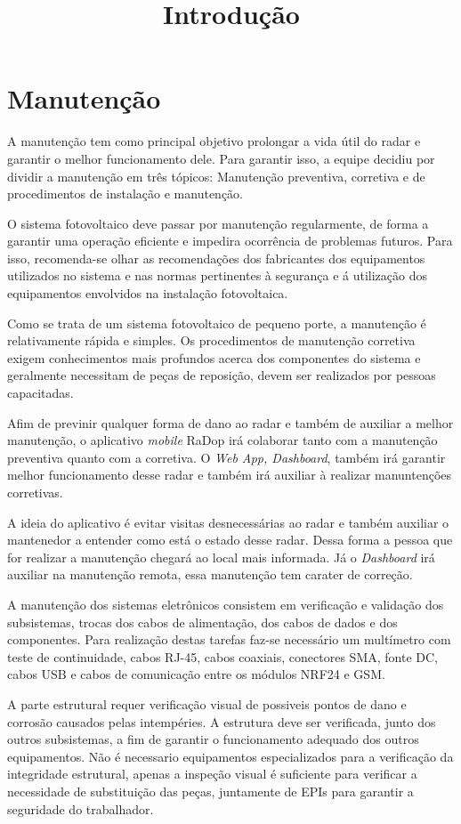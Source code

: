 
\chapter{Manutenção}

\title{Introdução}

A manutenção tem como principal objetivo prolongar a vida útil do radar e garantir o melhor funcionamento dele. Para garantir isso, a equipe decidiu por dividir a manutenção em três tópicos: Manutenção preventiva, corretiva e de procedimentos de instalação e manutenção.

O sistema fotovoltaico deve passar por manutenção regularmente, de forma a garantir uma operação eficiente e impedira ocorrência de problemas futuros. Para isso, recomenda-se olhar as recomendações dos fabricantes dos equipamentos utilizados no sistema e nas normas pertinentes à segurança e á utilização dos equipamentos envolvidos na instalação fotovoltaica.

Como se trata de um sistema fotovoltaico de pequeno porte, a manutenção é relativamente rápida e simples. Os procedimentos de manutenção corretiva exigem conhecimentos mais profundos acerca dos componentes do sistema e geralmente necessitam de peças de reposição, devem ser realizados por pessoas capacitadas.



Afim de previnir qualquer forma de dano ao radar e também de auxiliar a melhor manutenção, o aplicativo \textit{mobile} RaDop irá colaborar tanto com a manutenção preventiva quanto com a corretiva. O \textit{Web App, Dashboard}, também irá garantir melhor funcionamento desse radar e também irá auxiliar à realizar manuntenções corretivas.

A ideia do aplicativo é evitar visitas desnecessárias ao radar e também auxiliar o mantenedor a entender como está o estado desse radar. Dessa forma a pessoa que for realizar a manutenção chegará ao local mais informada. Já o \textit{Dashboard} irá auxiliar na manutenção remota, essa manutenção tem carater de correção.

A manutenção dos sistemas eletrônicos consistem em verificação e validação dos subsistemas, trocas dos cabos de alimentação, dos cabos de dados e dos componentes. Para realização destas tarefas faz-se necessário um multímetro com teste de continuidade, cabos RJ-45, cabos coaxiais, conectores SMA, fonte DC, cabos USB e cabos de comunicação entre os módulos NRF24 e GSM.

A parte estrutural requer verificação visual de possiveis pontos de dano e corrosão causados pelas intempéries. A estrutura deve ser verificada, junto dos outros subsistemas, a fim de garantir o funcionamento adequado dos outros equipamentos. Não é necessario equipamentos especializados para a verificação da integridade estrutural, apenas a inspeção visual é suficiente para verificar a necessidade de substituição das peças, juntamente de EPIs para garantir a seguridade do trabalhador.


